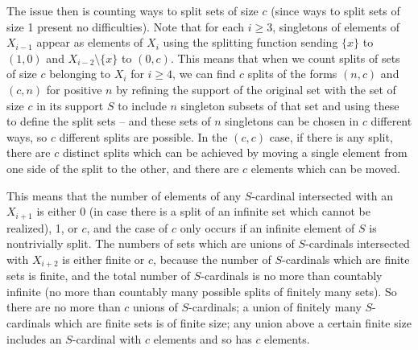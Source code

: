 \documentclass{article}
\begin{document}
\begin{description}
The issue then is counting ways to split sets of size $c$ (since ways to split sets of size 1 present no difficulties).  Note that for each $i \geq 3$, singletons of elements of $X_{i-1}$ appear as elements of
$X_{i}$ using the splitting function sending $\{x\}$ to $(1,0)$ and $X_{i-2} \setminus \{x\}$ to $(0,c)$.  This means that when we count splits of sets of size $c$ belonging to $X_i$ for $i \geq 4$,
we can find $c$ splits of the forms $(n,c)$ and $(c,n)$ for positive $n$ by refining the support of the original set with the set of size $c$ in its support $S$ to include $n$ singleton subsets of that set
and using these to define the split sets -- and these sets of $n$ singletons can be chosen in $c$ different ways, so $c$ different splits are possible.  In the $(c,c)$ case, if there is any split, there
are $c$ distinct splits which can be achieved by moving a single element from one side of the split to the other, and there are $c$ elements which can be moved.

This means that the number of elements of any $S$-cardinal intersected with an $X_{i+1}$ is either 0 (in case there is a split of an infinite set which cannot be realized), 1, or $c$, and the case of $c$ only occurs if an infinite element of $S$ is nontrivially split.  The numbers of sets which are unions of $S$-cardinals intersected with $X_{i+2}$ is either finite or $c$, because the number of $S$-cardinals which are finite sets is finite, and the total number of $S$-cardinals is no more than countably infinite (no more than countably many possible splits of finitely many sets).  So there are no more than $c$ unions of $S$-cardinals;
a union of finitely many $S$-cardinals which are finite sets is of finite size;  any union above a certain finite size includes an $S$-cardinal with $c$ elements and so has $c$ elements.


\end{description}
\end{document}
